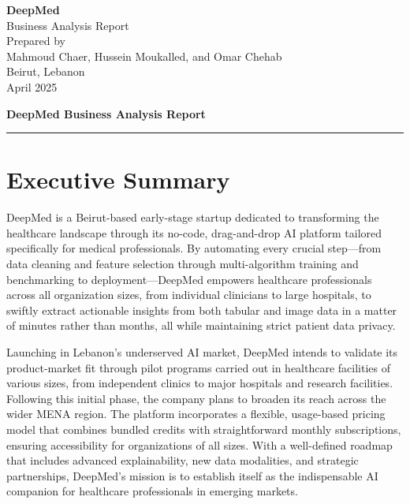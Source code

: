 \documentclass[11pt,a4paper]{article}
\begin{document}
\begin{titlepage}
  \centering
  \vspace*{\fill}
  
  {\Huge \bfseries DeepMed}\\[1.5em]
  {\LARGE Business Analysis Report}\\[3em]
  
  {\Large Prepared by}\\[0.5em]
  {\large Mahmoud Chaer, Hussein Moukalled, and Omar Chehab}\\[2em]
  
  {\large Beirut, Lebanon}\\[1em]
  {\large April 2025}
  
  \vspace*{\fill}
\end{titlepage}

\begin{center}
  {\LARGE \textbf{DeepMed Business Analysis Report}}\\[1em]
  \rule{\textwidth}{0.5pt}
\end{center}

\section*{Executive Summary}
DeepMed is a Beirut-based early-stage startup dedicated to transforming the healthcare landscape through its no-code, drag-and-drop AI platform tailored specifically for medical professionals. By automating every crucial step—from data cleaning and feature selection through multi-algorithm training and benchmarking to deployment—DeepMed empowers healthcare professionals across all organization sizes, from individual clinicians to large hospitals, to swiftly extract actionable insights from both tabular and image data in a matter of minutes rather than months, all while maintaining strict patient data privacy.

Launching in Lebanon's underserved AI market, DeepMed intends to validate its product-market fit through pilot programs carried out in healthcare facilities of various sizes, from independent clinics to major hospitals and research facilities. Following this initial phase, the company plans to broaden its reach across the wider MENA region. The platform incorporates a flexible, usage-based pricing model that combines bundled credits with straightforward monthly subscriptions, ensuring accessibility for organizations of all sizes. With a well-defined roadmap that includes advanced explainability, new data modalities, and strategic partnerships, DeepMed's mission is to establish itself as the indispensable AI companion for healthcare professionals in emerging markets.
\end{document}
